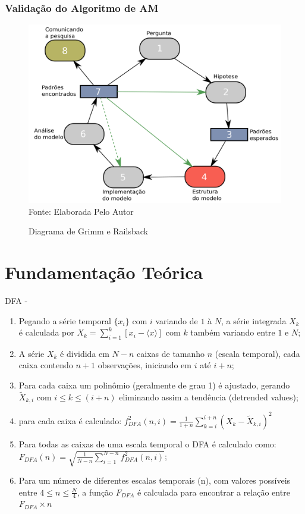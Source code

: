 \documentclass[10pt]{beamer}
\begin{document}
\begin{frame}
  \frametitle{Validação do Algoritmo de AM}

  \begin{figure}[!htb]
    \centering
    \caption{Diagrama de Grimm e Railsback}
    \includegraphics[width=.7\textwidth]{../Figures/intro/Ciclo_Grimm.png}
    \\{\footnotesize Fonte: Elaborada Pelo Autor}
    \label{fig:fluxoGrimm}
  \end{figure}

  

\end{frame}


\section{Fundamentação Teórica}


\begin{frame}{DFA - \cite{Peng_1994}}


  \begin{enumerate}
    \label{list:dfa}
    \item Pegando a série temporal \(\{x_{i}\}\) com  \(i\) variando de  \(1\) à \(N\), a série integrada \(X_{k}\) é calculada por \(X_{k} = \sum_{i=1}^{k}\left[x_{i} - \langle x \rangle \right] \) com \(k\) também variando entre \(1\) e \(N\);
    \item A série  \(X_{k}\) é dividida em \(N - n\) caixas de tamanho \(n\) (escala temporal), cada caixa contendo \(n + 1\) observações, iniciando em \(i\) até \(i + n\);
    \item Para cada caixa um polinômio (geralmente de grau 1) é ajustado, gerando \(\widetilde{X}_{k, i}\) com \( i \le k \le (i + n) \) eliminando assim a tendência (detrended values);
    \item  para cada caixa é calculado: \(f_{DFA}^{2}(n, i) = \frac{1}{1+n} \sum_{k=i}^{i + n}(X_{k}-\widetilde{X}_{k, i})^{2}\)
    \item Para todas as caixas de uma escala temporal o DFA é calculado como: \(F_{DFA}(n) = \sqrt{\frac{1}{N - n} \sum_{i=1}^{N-n} f_{DFA}^{2}(n, i)}\);
    \item Para um número de diferentes escalas temporais (n), com valores possíveis entre \( 4 \le n \le \frac{N}{4}\), a função \(F_{DFA}\) é calculada para encontrar a relação entre \(F_{DFA} \times n\)
  \end{enumerate}


\end{frame}
\end{document}
